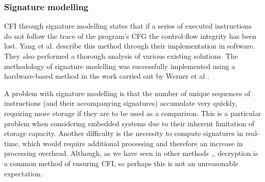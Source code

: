 \subsubsection*{Signature modelling}
CFI through signature modelling states that if a series of executed instructions do not follow the trace of the program's CFG the control-flow integrity has been lost. Yang et al. \cite{Yang2013} describe this method through their implementation in software. They also performed a thorough analysis of various existing solutions. The methodology of signature modelling was successfully implemented using a hardware-based method in the work carried out by Werner et al \cite{Werner2016}.

A problem with signature modelling is that the number of unique sequences of instructions (and their accompanying signatures) accumulate very quickly, requiring more storage if they are to be used as a comparison. This is a particular problem when considering embedded systems due to their inherent limitation of storage capacity. Another difficulty is the necessity to compute signatures in real-time, which would require additional processing and therefore an increase in processing overhead. Although, as we have seen in other methods \cite{Davi2015},\cite{Lee2019}, decryption is a common method of ensuring CFI, so perhaps this is not an unreasonable expectation.

